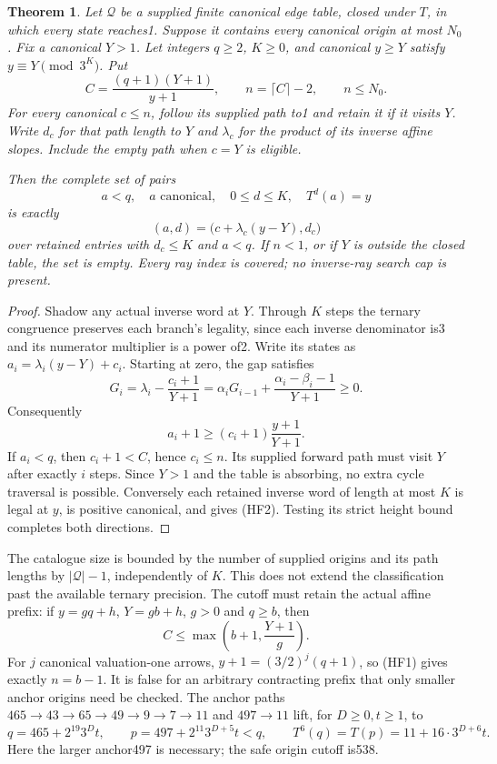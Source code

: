 \documentclass[11pt]{article}
\newtheorem{theorem}{Theorem}
\begin{document}
\begin{theorem}\label{thm:historyfrontier}
Let $\mathcal Q$ be a supplied finite canonical edge table, closed under
$T$, in which every state reaches1. Suppose it contains every canonical
origin at most $N_0$. Fix a canonical $Y>1$. Let integers $q\ge2$, $K\ge0$,
and canonical $y\ge Y$ satisfy $y\equiv Y\pmod{3^K}$. Put
\[
 C=\frac{(q+1)(Y+1)}{y+1},\qquad n=\lceil C\rceil-2,
 \qquad n\le N_0.
 \tag{HF1}
\]
For every canonical $c\le n$, follow its supplied path to1 and retain
it if it visits $Y$. Write $d_c$ for that path length to $Y$ and
$\lambda_c$ for the product of its inverse affine slopes.
Include the empty path when $c=Y$ is eligible.

Then the complete set of pairs
\[
 a<q,\quad a\text{ canonical},\quad 0\le d\le K,\quad T^d(a)=y
\]
is exactly
\[
 (a,d)=\bigl(c+\lambda_c(y-Y),d_c\bigr)
 \tag{HF2}
\]
over retained entries with $d_c\le K$ and $a<q$.
If $n<1$, or if $Y$ is outside the closed table, the set is empty.
Every ray index is covered; no inverse-ray search cap is present.
\end{theorem}
\begin{proof}
Shadow any actual inverse word at $Y$. Through $K$ steps the ternary
congruence preserves each branch's legality, since each inverse denominator
is3 and its numerator multiplier is a power of2. Write its states as
$a_i=\lambda_i(y-Y)+c_i$. Starting at zero, the gap satisfies
\[
 G_i=\lambda_i-\frac{c_i+1}{Y+1}
 =\alpha_iG_{i-1}+\frac{\alpha_i-\beta_i-1}{Y+1}\ge0.
\]
Consequently
\[
 a_i+1\ge(c_i+1)\frac{y+1}{Y+1}.
\]
If $a_i<q$, then $c_i+1<C$, hence $c_i\le n$.
Its supplied forward path must visit $Y$ after exactly $i$ steps.
Since $Y>1$ and the table is absorbing, no extra cycle traversal is
possible. Conversely each retained inverse word of length at most $K$
is legal at $y$, is positive canonical, and gives (HF2).
Testing its strict height bound completes both directions.
\end{proof}

The catalogue size is bounded by the number of supplied origins and
its path lengths by $|\mathcal Q|-1$, independently of $K$.
This does not extend the classification past the available ternary
precision. The cutoff must retain the actual affine prefix: if
$y=gq+h$, $Y=gb+h$, $g>0$ and $q\ge b$, then
\[
 C\le\max\left(b+1,\frac{Y+1}{g}\right).
\]
For $j$ canonical valuation-one arrows,
$y+1=(3/2)^j(q+1)$, so (HF1) gives exactly $n=b-1$.
It is false for an arbitrary contracting prefix that only smaller
anchor origins need be checked. The anchor paths
$465\to43\to65\to49\to9\to7\to11$ and $497\to11$
lift, for $D\ge0,t\ge1$, to
\[
 q=465+2^{19}3^Dt,\qquad
 p=497+2^{11}3^{D+5}t<q,\qquad
 T^6(q)=T(p)=11+16\cdot3^{D+6}t.
 \tag{HF3}
\]
Here the larger anchor497 is necessary; the safe origin cutoff is538.
\end{document}
